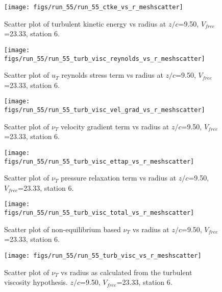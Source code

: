 \begin{figure}[H]
\centering
\texttt{[image: figs/run\_55/run\_55\_ctke\_vs\_r\_meshscatter]}
\caption{Scatter plot of turbulent kinetic energy vs radius at $z/c$=9.50, $V_{free}$=23.33, station 6.}
\end{figure}


\begin{figure}[H]
\centering
\texttt{[image: figs/run\_55/run\_55\_turb\_visc\_reynolds\_vs\_r\_meshscatter]}
\caption{Scatter plot of $
u_T$ reynolds stress term vs radius at $z/c$=9.50, $V_{free}$=23.33, station 6.}
\end{figure}


\begin{figure}[H]
\centering
\texttt{[image: figs/run\_55/run\_55\_turb\_visc\_vel\_grad\_vs\_r\_meshscatter]}
\caption{Scatter plot of $\nu_T$ velocity gradient term vs radius at $z/c$=9.50, $V_{free}$=23.33, station 6.}
\end{figure}


\begin{figure}[H]
\centering
\texttt{[image: figs/run\_55/run\_55\_turb\_visc\_ettap\_vs\_r\_meshscatter]}
\caption{Scatter plot of $\nu_T$ pressure relaxation term vs radius at $z/c$=9.50, $V_{free}$=23.33, station 6.}
\end{figure}


\begin{figure}[H]
\centering
\texttt{[image: figs/run\_55/run\_55\_turb\_visc\_total\_vs\_r\_meshscatter]}
\caption{Scatter plot of non-equilibrium based $\nu_T$ vs radius at $z/c$=9.50, $V_{free}$=23.33, station 6.}
\end{figure}


\begin{figure}[H]
\centering
\texttt{[image: figs/run\_55/run\_55\_turb\_visc\_vs\_r\_meshscatter]}
\caption{Scatter plot of $\nu_T$ vs radius as calculated from the turbulent viscosity hypothesis. $z/c$=9.50, $V_{free}$=23.33, station 6.}
\end{figure}



